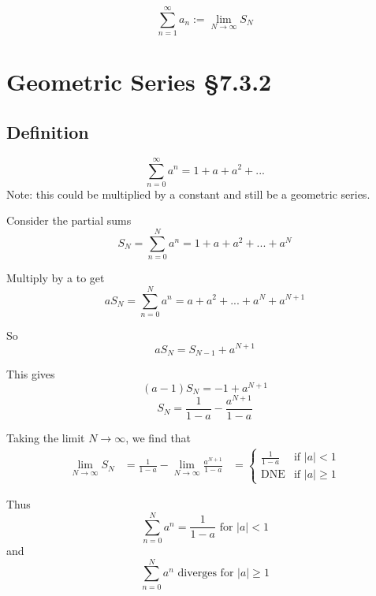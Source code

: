\documentclass[11pt]{article}
\begin{document}
\[ \sum_{n=1}^\infty a_n := \lim_{N\rightarrow\infty}S_N \]

\section{Geometric Series §7.3.2}
\subsection*{Definition}
\[ \sum_{n=0}^\infty a^n = 1 + a + a^2 + ... \]
Note: this could be multiplied by a constant and still be a geometric series.

Consider the partial sums
\[ S_N =  \sum_{n=0}^N a^n = 1 + a + a^2 + ... + a^N \]

Multiply by a to get
\[ aS_N =  \sum_{n=0}^N a^n = a + a^2 + ... + a^N + a^{N+1} \]

So
\[ aS_N = S_{N-1} + a^{N+1} \]

This gives
\[ (a-1)S_N = -1 + a^{N+1} \]
\[ S_N = \frac{1}{1-a} - \frac{a^{N+1}}{1-a}  \]

Taking the limit $N\rightarrow\infty$, we find that
\begin{align*}
\lim_{N\rightarrow\infty}S_N &= \frac{1}{1-a} - \lim_{N\rightarrow\infty} \frac{a^{N+1}}{1-a}
 &=
 \begin{cases}
 	\frac{1}{1-a} & \text{if } |a| < 1 \\
 	\text{DNE} & \text{if } |a| \geq 1
 \end{cases}
\end{align*}

Thus
\[ \sum_{n=0}^N a^n = \frac{1}{1-a} \text{ for } |a| < 1 \]
and
\[ \sum_{n=0}^N a^n \text{ diverges for } |a| \geq 1 \]
\end{document}
